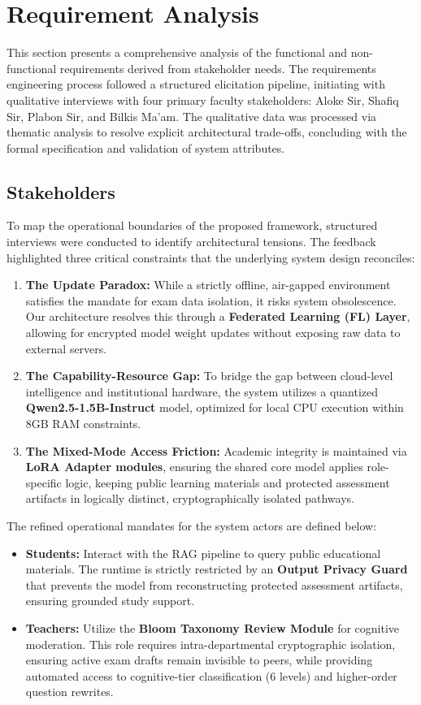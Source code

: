 \section{Requirement Analysis}

This section presents a comprehensive analysis of the functional and non-functional requirements derived from stakeholder needs. The requirements engineering process followed a structured elicitation pipeline, initiating with qualitative interviews with four primary faculty stakeholders: Aloke Sir, Shafiq Sir, Plabon Sir, and Bilkis Ma'am. The qualitative data was processed via thematic analysis to resolve explicit architectural trade-offs, concluding with the formal specification and validation of system attributes.

\subsection{Stakeholders}
To map the operational boundaries of the proposed framework, structured interviews were conducted to identify architectural tensions. The feedback highlighted three critical constraints that the underlying system design reconciles:

\begin{enumerate}
    \item \textbf{The Update Paradox:} While a strictly offline, air-gapped environment satisfies the mandate for exam data isolation, it risks system obsolescence. Our architecture resolves this through a \textbf{Federated Learning (FL) Layer}, allowing for encrypted model weight updates without exposing raw data to external servers.
    \item \textbf{The Capability-Resource Gap:} To bridge the gap between cloud-level intelligence and institutional hardware, the system utilizes a quantized \textbf{Qwen2.5-1.5B-Instruct} model, optimized for local CPU execution within 8GB RAM constraints.
    \item \textbf{The Mixed-Mode Access Friction:} Academic integrity is maintained via \textbf{LoRA Adapter modules}, ensuring the shared core model applies role-specific logic, keeping public learning materials and protected assessment artifacts in logically distinct, cryptographically isolated pathways.
\end{enumerate}

The refined operational mandates for the system actors are defined below:

\begin{itemize}
    \item \textbf{Students:} Interact with the RAG pipeline to query public educational materials. The runtime is strictly restricted by an \textbf{Output Privacy Guard} that prevents the model from reconstructing protected assessment artifacts, ensuring grounded study support.
    \item \textbf{Teachers:} Utilize the \textbf{Bloom Taxonomy Review Module} for cognitive moderation. This role requires intra-departmental cryptographic isolation, ensuring active exam drafts remain invisible to peers, while providing automated access to cognitive-tier classification (6 levels) and higher-order question rewrites.
\end{itemize}

